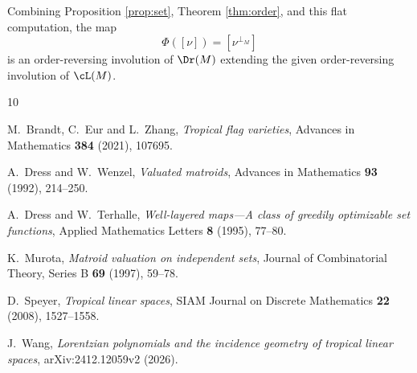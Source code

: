 Combining Proposition \ref{prop:set}, Theorem \ref{thm:order}, and this
flat computation, the map
\[
        \Phi([\nu])=[\nu^{\perp_M}]
\]
is an order-reversing involution of $\Dr(M)$ extending the given
order-reversing involution of $\cL(M)$.

\begin{thebibliography}{10}

M.~Brandt, C.~Eur and L.~Zhang,
\emph{Tropical flag varieties},
Advances in Mathematics \textbf{384} (2021), 107695.

A.~Dress and W.~Wenzel,
\emph{Valuated matroids},
Advances in Mathematics \textbf{93} (1992), 214--250.

A.~Dress and W.~Terhalle,
\emph{Well-layered maps---A class of greedily optimizable set functions},
Applied Mathematics Letters \textbf{8} (1995), 77--80.

K.~Murota,
\emph{Matroid valuation on independent sets},
Journal of Combinatorial Theory, Series B \textbf{69} (1997), 59--78.

D.~Speyer,
\emph{Tropical linear spaces},
SIAM Journal on Discrete Mathematics \textbf{22} (2008), 1527--1558.

J.~Wang,
\emph{Lorentzian polynomials and the incidence geometry of tropical
linear spaces},
arXiv:2412.12059v2 (2026).

\end{thebibliography}